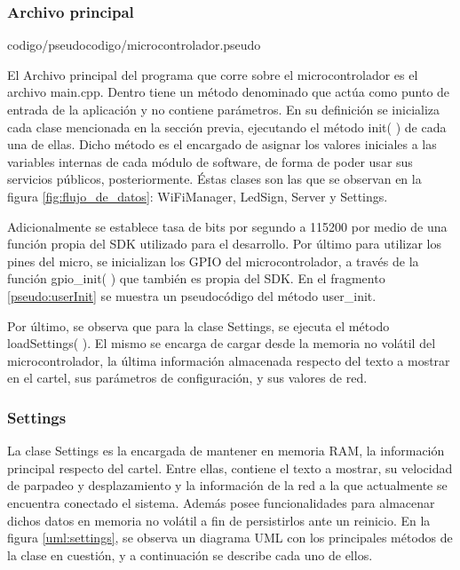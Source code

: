 \subsubsection{Archivo principal} \label{sec:archivo_principal}

 {codigo/pseudocodigo/microcontrolador.pseudo}

El Archivo principal del programa que corre sobre el microcontrolador es el archivo main.cpp.
Dentro tiene un método denominado  que actúa como punto de entrada de la aplicación y no contiene parámetros.
En su definición se inicializa cada clase mencionada en la sección previa, ejecutando el método init( ) de cada una de ellas.
Dicho método es el encargado de asignar los valores iniciales a las variables internas de cada módulo de software, de forma de poder usar sus servicios públicos, posteriormente.
Éstas clases son las que se observan en la figura \ref{fig:flujo_de_datos}: WiFiManager, LedSign, Server y Settings.

Adicionalmente se establece tasa de bits por segundo a 115200 por medio de una función propia del SDK utilizado para el desarrollo.
Por último para utilizar los pines del micro, se inicializan los GPIO del microcontrolador, a través de la función gpio\_init( ) que también es propia del SDK.
En el fragmento \ref{pseudo:userInit} se muestra un pseudocódigo del método user\_init\( \).

Por último, se observa que para la clase Settings, se ejecuta el método loadSettings( ).
El mismo se encarga de cargar desde la memoria no volátil del microcontrolador, la última información almacenada respecto del texto a mostrar en el cartel, sus parámetros de configuración, y sus valores de red. \newline

\subsubsection{Settings}

La clase Settings es la encargada de mantener en memoria RAM, la información principal respecto del cartel.
Entre ellas, contiene el texto a mostrar, su velocidad de parpadeo y desplazamiento y la información de la red a la que actualmente se encuentra conectado el sistema.
Además posee funcionalidades para almacenar dichos datos en memoria no volátil a fin de persistirlos ante un reinicio.
En la figura \ref{uml:settings}, se observa un diagrama UML con los principales métodos de la clase en cuestión, y a continuación se describe cada uno de ellos.

